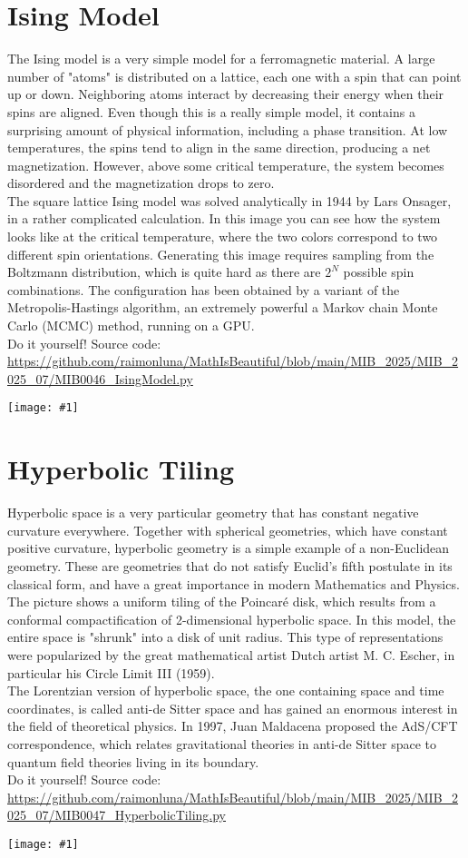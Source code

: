 \documentclass[12pt,landscape]{article}
\newcommand{\artpage}[3][]{%
  \begin{minipage}[t]{0.48\linewidth}
    \vspace{0pt} %
    \section*{#2} %
    \addcontentsline{toc}{section}{#2} %
    #3 %
  \end{minipage}%
  \hfill
  \begin{minipage}[t]{0.48\linewidth}
    \vspace{0pt} %
    \centering
    \texttt{[image: \#1]}
  \end{minipage}%
  \newpage
}
\begin{document}
\artpage[../Output/LowQuality/MIB0046_IsingModel.png]{Ising Model}{%
The Ising model is a very simple model for a ferromagnetic material. A large number of "atoms" is distributed on a lattice, each one with a spin that can point up or down. Neighboring atoms interact by decreasing their energy when their spins are aligned. Even though this is a really simple model, it contains a surprising amount of physical information, including a phase transition. At low temperatures, the spins tend to align in the same direction, producing a net magnetization. However, above some critical temperature, the system becomes disordered and the magnetization drops to zero.\\

The square lattice Ising model was solved analytically in 1944 by Lars Onsager, in a rather complicated calculation. In this image you can see how the system looks like at the critical temperature, where the two colors correspond to two different spin orientations. Generating this image requires sampling from the Boltzmann distribution, which is quite hard as there are $2^N$ possible spin combinations. The configuration has been obtained by a variant of the Metropolis-Hastings algorithm, an extremely powerful a Markov chain Monte Carlo (MCMC) method, running on a GPU.\\

Do it yourself! Source code: \url{https://github.com/raimonluna/MathIsBeautiful/blob/main/MIB_2025/MIB_2025_07/MIB0046_IsingModel.py}
}

\artpage[../Output/LowQuality/MIB0047_HyperbolicTiling.png]{Hyperbolic Tiling}{%
Hyperbolic space is a very particular geometry that has constant negative curvature everywhere. Together with spherical geometries, which have constant positive curvature, hyperbolic geometry is a simple example of a non-Euclidean geometry. These are geometries that do not satisfy Euclid's fifth postulate in its classical form, and have a great importance in modern Mathematics and Physics.\\

The picture shows a uniform tiling of the Poincaré disk, which results from a conformal compactification of 2-dimensional hyperbolic space. In this model, the entire space is "shrunk" into a disk of unit radius. This type of representations were popularized by the great mathematical artist Dutch artist M. C. Escher, in particular his Circle Limit III (1959).\\

The Lorentzian version of hyperbolic space, the one containing space and time coordinates, is called anti-de Sitter space and has gained an enormous interest in the field of theoretical physics. In 1997, Juan Maldacena proposed the AdS/CFT correspondence, which relates gravitational theories in anti-de Sitter space to quantum field theories living in its boundary.\\

Do it yourself! Source code: \url{https://github.com/raimonluna/MathIsBeautiful/blob/main/MIB_2025/MIB_2025_07/MIB0047_HyperbolicTiling.py}
}
\end{document}
